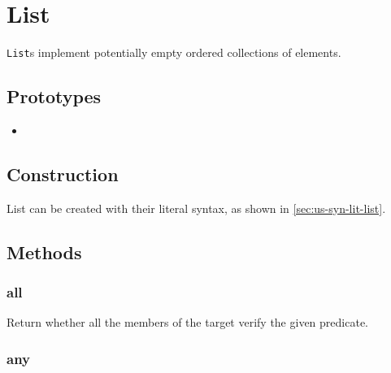 \section{List}

\lstinline|List|s implement potentially empty ordered collections of
elements.

\subsection{Prototypes}

\begin{itemize}
\item {}
\end{itemize}

\subsection{Construction}

List can be created with their literal syntax, as shown in
\autoref{sec:us-syn-lit-list}.


\subsection{Methods}

\subsubsection{all}

Return whether all the members of the target verify the given
predicate.


\subsubsection{any}

